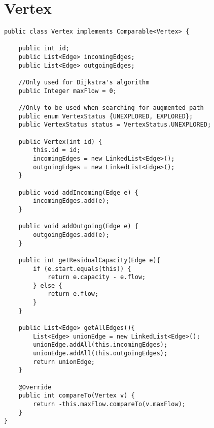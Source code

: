 \chapter{Vertex}
\lstset{language=Java}
\begin{lstlisting}[caption=Vertex Source Code]
public class Vertex implements Comparable<Vertex> {
	
	public int id;
	public List<Edge> incomingEdges;
	public List<Edge> outgoingEdges;
	
	//Only used for Dijkstra's algorithm
	public Integer maxFlow = 0;
	
	//Only to be used when searching for augmented path
	public enum VertexStatus {UNEXPLORED, EXPLORED};
	public VertexStatus status = VertexStatus.UNEXPLORED;
	
	public Vertex(int id) {
		this.id = id;
		incomingEdges = new LinkedList<Edge>();
		outgoingEdges = new LinkedList<Edge>();
	}
	
	public void addIncoming(Edge e) {
		incomingEdges.add(e);
	}
	
	public void addOutgoing(Edge e) {
		outgoingEdges.add(e);
	}
	
	public int getResidualCapacity(Edge e){
		if (e.start.equals(this)) {
			return e.capacity - e.flow;
		} else {
			return e.flow;
		}
	}
	
	public List<Edge> getAllEdges(){
		List<Edge> unionEdge = new LinkedList<Edge>();
		unionEdge.addAll(this.incomingEdges);
		unionEdge.addAll(this.outgoingEdges);
		return unionEdge;
	}
	
	@Override
	public int compareTo(Vertex v) {
		return -this.maxFlow.compareTo(v.maxFlow);
	}
}
\end{lstlisting}